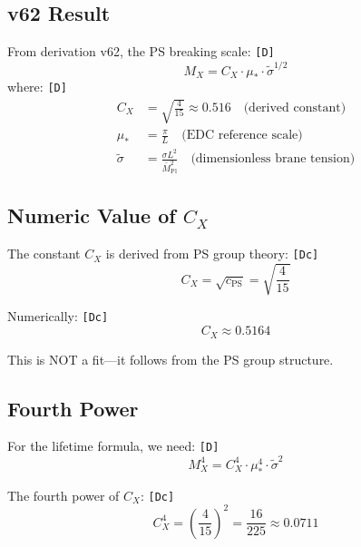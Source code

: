 \documentclass[11pt,a4paper]{article}
\newcommand{\tagD}{\textcolor{green!50!black}{\texttt{[D]}}}
\newcommand{\tagDc}{\textcolor{blue!70!black}{\texttt{[Dc]}}}
\theoremstyle{definition}
\begin{document}
\subsection{v62 Result}
\label{subsec:v62-result}

From derivation v62, the PS breaking scale: \tagD{}
\begin{equation}
\label{eq:mx-v62}
\boxed{M_X = C_X \cdot \mu_* \cdot \tilde{\sigma}^{1/2}}
\end{equation}
where: \tagD{}
\begin{align}
\label{eq:cx-def}
C_X &= \sqrt{\frac{4}{15}} \approx 0.516 \quad \text{(derived constant)} \\
\label{eq:mustar-def}
\mu_* &= \frac{\pi}{L} \quad \text{(EDC reference scale)} \\
\label{eq:sigma-tilde-def}
\tilde{\sigma} &= \frac{\sigma L^2}{\bar{M}_{\text{Pl}}^2} \quad \text{(dimensionless brane tension)}
\end{align}

\subsection{Numeric Value of $C_X$}
\label{subsec:cx-numeric}

The constant $C_X$ is derived from PS group theory: \tagDc{}
\begin{equation}
\label{eq:cx-derivation}
C_X = \sqrt{c_{\text{PS}}} = \sqrt{\frac{4}{15}}
\end{equation}

Numerically: \tagDc{}
\begin{equation}
\label{eq:cx-numeric}
C_X \approx 0.5164
\end{equation}

This is NOT a fit---it follows from the PS group structure.

\subsection{Fourth Power}
\label{subsec:fourth-power}

For the lifetime formula, we need: \tagD{}
\begin{equation}
\label{eq:mx-fourth}
M_X^4 = C_X^4 \cdot \mu_*^4 \cdot \tilde{\sigma}^2
\end{equation}

The fourth power of $C_X$: \tagDc{}
\begin{equation}
\label{eq:cx-fourth}
C_X^4 = \left(\frac{4}{15}\right)^2 = \frac{16}{225} \approx 0.0711
\end{equation}
\end{document}
